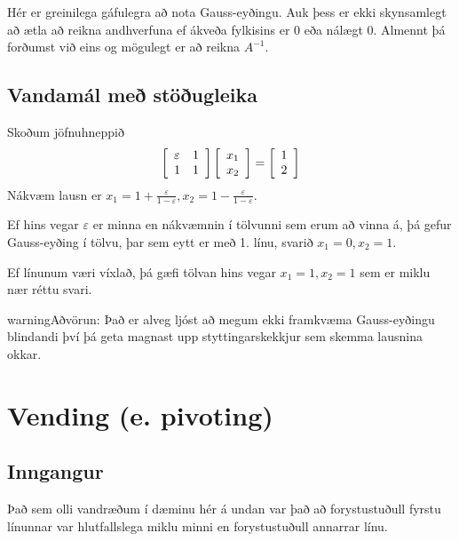 \documentclass[letterpaper,10pt,icelandic]{sphinxmanual}
\begin{document}
Hér er greinilega gáfulegra að nota Gauss-eyðingu. Auk þess er ekki skynsamlegt
að ætla að reikna andhverfuna ef ákveða fylkisins er 0 eða nálægt 0.
Almennt þá forðumst við eins og mögulegt er að reikna \(A^{-1}\).


\subsection{Vandamál með stöðugleika}
\label{kafli08:vandamal-me-stougleika}\label{kafli08:index-2}
Skoðum jöfnuhneppið
\begin{gather}
\begin{split}\left[\begin{array}{ll}
\varepsilon& 1\\
1 & 1
\end{array}\right] \left[\begin{array}{l}
x_1\\
x_2
\end{array}\right]
=\left[\begin{array}{l}
1\\
2
\end{array}\right]\end{split}\notag
\end{gather}
Nákvæm lausn er \(x_1=1+\frac{\varepsilon}{1-\varepsilon},
x_2=1-\frac{\varepsilon}{1-\varepsilon}\).

Ef hins vegar \(\varepsilon\) er minna en nákvæmnin í tölvunni sem
erum að vinna á, þá gefur Gauss-eyðing í tölvu, þar sem eytt er með
1. línu, svarið \(x_1 = 0, x_2 = 1\).

Ef línunum væri víxlað, þá gæfi tölvan hins vegar \(x_1=1, x_2=1\)
sem er miklu nær réttu svari.

\begin{notice}{warning}{Aðvörun:}
Það er alveg ljóst að megum ekki framkvæma Gauss-eyðingu blindandi því
þá geta magnast upp styttingarskekkjur sem skemma lausnina okkar.
\end{notice}


\section{Vending (e. pivoting)}
\label{kafli08:index-4}\label{kafli08:vending-e-pivoting}

\subsection{Inngangur}
\label{kafli08:inngangur}
Það sem olli vandræðum í dæminu hér á undan var það að forystustuðull
fyrstu línunnar var hlutfallslega miklu minni en forystustuðull annarrar
línu.
\end{document}
